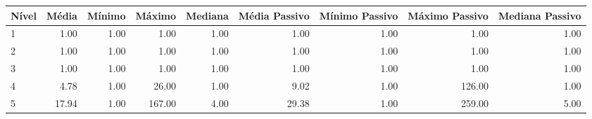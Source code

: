 \begin{table}[ht]
\centering
\begin{tabular}{lrrrrrrrr}
  \hline
Nível & Média & Mínimo & Máximo & Mediana & Média Passivo & Mínimo Passivo & Máximo Passivo & Mediana Passivo \\ 
  \hline
1 & 1.00 & 1.00 & 1.00 & 1.00 & 1.00 & 1.00 & 1.00 & 1.00 \\ 
  2 & 1.00 & 1.00 & 1.00 & 1.00 & 1.00 & 1.00 & 1.00 & 1.00 \\ 
  3 & 1.00 & 1.00 & 1.00 & 1.00 & 1.00 & 1.00 & 1.00 & 1.00 \\ 
  4 & 4.78 & 1.00 & 26.00 & 1.00 & 9.02 & 1.00 & 126.00 & 1.00 \\ 
  5 & 17.94 & 1.00 & 167.00 & 4.00 & 29.38 & 1.00 & 259.00 & 5.00 \\ 
   \hline
\end{tabular}
\end{table}
